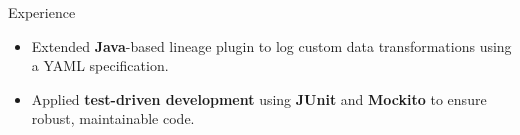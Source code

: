 \documentclass{resume} %
\begin{document}
\begin{workSection}{Experience}
\begin{itemize}
		\item Extended \textbf{Java}-based lineage plugin to log custom data transformations using a YAML specification.
		\item Applied \textbf{test-driven development} using \textbf{JUnit} and \textbf{Mockito} to ensure robust, maintainable code.


	\end{itemize}
	
	

\end{workSection}
\end{document}
